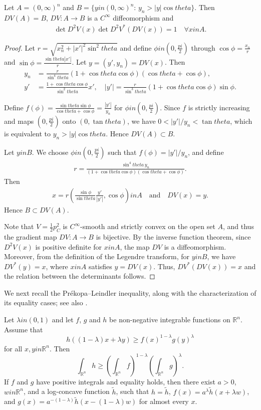 \documentclass[12pt]{amsart}
\def\theta{theta}%
\def\pi{pi}%
\def\in{in }%
\numberwithin{equation}{section}
\newcommand{\8}{\infty}
\newcommand{\la}{\lambda}
\renewcommand{\(}{\left(}
\renewcommand{\)}{\right)}
\newcommand{\eq}[1]{\begin{equation}\begin{alignedat}{2} #1 \end{alignedat}\end{equation}}
\newcommand{\q}{\quad}
\begin{document}
\begin{lemma}\label{lem 3}Let $A=(0,\infty)^n$ and $B=\{ y \in (0,\infty)^n :\, y_n> |y|\cos\theta \}$. Then $ D V(A) =B$, $DV: A\to B$ is a $C^{\infty}$ diffeomorphism and
\eq{
\det D^2V(x)\det D^2V^{\ast}(DV(x))=1\q \forall x\in A.
}
\end{lemma}
\begin{proof}
Let $r=\sqrt{x_n^2+|x'|^2\sin^2\theta}$ and define $\phi\in (0,\frac{\pi}{2})$ through $\cos \phi=\frac{x_n}{r}$ and $\sin \phi=\frac{\sin\theta |x'|}{r}$. Let $y=(y',y_n)=DV(x)$. Then
\eq{
y_n&=\frac{r}{\sin^4\theta}(1+\cos\theta \cos\phi)(\cos\theta+\cos\phi),\\
y'&=\frac{1+\cos\theta\cos\phi}{\sin^2\theta}x',\quad |y'|=\frac{r}{\sin^3\theta}(1+\cos\theta\cos\phi)\sin\phi.
}

Define $f(\phi)=\frac{\sin\theta \sin\phi}{\cos\theta+\cos\phi}=\frac{|y'|}{y_n}$ for $\phi\in (0,\frac{\pi}{2})$. Since $f$ is strictly increasing and maps $(0,\frac{\pi}{2})$ onto $(0,\tan\theta)$, we have $0<|y'|/y_n<\tan\theta$, which is equivalent to $y_n>|y|\cos\theta$. Hence $DV(A)\subset B$.

Let $y\in B$. We choose $\phi\in(0,\frac{\pi}{2})$ such that $f(\phi)=|y'|/y_n$, and define
\eq{
r=\frac{\sin^4\theta\, y_n}{(1+\cos\theta\cos\phi)(\cos\theta+\cos\phi)}.
}
Then
\eq{
x=r\left(\frac{\sin\phi}{\sin\theta}\frac{y'}{|y'|},\cos\phi\right)\in A \quad \text{and} \quad  DV(x)=y.
}
Hence $B\subset DV(A)$.

Note that $V=\frac{1}{2}p_C^2$ is $C^\infty$-smooth and strictly convex on the open set $A$, and thus the gradient map $DV: A \to B$ is bijective. By the inverse function theorem, since $D^2 V(x)$ is positive definite for $x \in A$, the map $DV$ is a diffeomorphism. Moreover, from the definition of the Legendre transform, for $y \in B$, we have $DV^{\ast}(y) = x$, where $x \in A$ satisfies $y = DV(x)$. Thus, $DV^{\ast}(DV(x))=x$ and the relation between the determinants follows.
\end{proof}

We next recall the Pr\'ekopa--Leindler inequality, along with the characterization of its equality cases; see also \cite{BB10, BD21, BFR23}.

\begin{theorem}\cite{Pre71,Lei72,Bor75,Dub77}
Let $\lambda \in (0, 1)$ and let $f$, $g$ and $h$ be non-negative integrable functions on $\mathbb{R}^n$. Assume that
\[
h((1 - \lambda)x + \lambda y) \geq f(x)^{1-\lambda} g(y)^{\lambda}
\]
for all $x, y \in \mathbb{R}^n$. Then
\[
\int_{\mathbb{R}^n} h  \geq \left( \int_{\mathbb{R}^n} f \right)^{1-\lambda} \left( \int_{\mathbb{R}^n} g  \right)^{\lambda}.
\]
If $f$ and $g$ have positive integrals and equality holds, then there exist $a > 0$, $w \in \mathbb{R}^n$, and a log-concave function $\tilde{h}$, such that $h = \tilde{h}$, $f(x) = a^{\la} \tilde{h}(x +\la w)$, and $g(x) = a^{ -(1-\lambda)} \tilde{h}(x -(1- \lambda) w)$ for almost every $x$.
\end{theorem}
\end{document}
